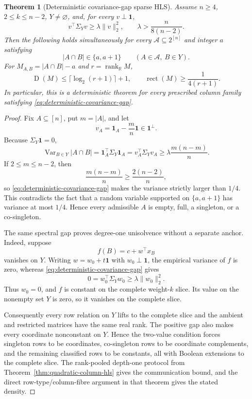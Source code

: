 \documentclass[11pt]{article}
\newtheorem{theorem}{Theorem}[section]
\theoremstyle{definition}
\theoremstyle{remark}
\newcommand{\cA}{\mathcal A}
\newcommand{\R}{\mathbb R}
\newcommand{\1}{\mathbf 1}
\newcommand{\Var}{\operatorname{Var}}
\newcommand{\rank}{\operatorname{rank}}
\newcommand{\rect}{\operatorname{rect}}
\newcommand{\Dcc}{\operatorname{D}}
\begin{document}
\begin{theorem}[Deterministic covariance-gap sparse HLS]
\label{thm:deterministic-spectral-sparse-hls}
Assume \(n\ge4\), \(2\le k\le n-2\), \(Y\ne\varnothing\), and, for every
\(v\perp\mathbf1\),
\begin{equation}\label{eq:deterministic-covariance-gap}
 v^\top\Sigma_Yv\ge\lambda\|v\|_2^2,
 \qquad
 \lambda>\frac{n}{8(n-2)}.
\end{equation}
Then the following holds simultaneously for every
\(\cA\subseteq2^{[n]}\) and integer \(a\) satisfying
\[
 |A\cap B|\in\{a,a+1\}
 \qquad(A\in\cA,\ B\in Y).
\]
For \(M_{A,B}=|A\cap B|-a\) and \(r=\rank_{\R}M\),
\[
 \Dcc(M)\le\lceil\log_2(r+1)\rceil+1,
 \qquad
 \rect(M)\ge\frac1{4(r+1)}.
\]
In particular, this is a deterministic theorem for every prescribed column
family satisfying \eqref{eq:deterministic-covariance-gap}.
\end{theorem}

\begin{proof}
Fix \(A\subseteq[n]\), put \(m=|A|\), and let
\[
 v_A=\mathbf1_A-\frac mn\mathbf1\in\mathbf1^\perp.
\]
Because \(\Sigma_Y\mathbf1=0\),
\[
 \Var_{B\in Y}|A\cap B|
 =\mathbf1_A^\top\Sigma_Y\mathbf1_A
 =v_A^\top\Sigma_Yv_A
 \ge\lambda\frac{m(n-m)}n.
\]
If \(2\le m\le n-2\), then
\[
 \frac{m(n-m)}n\ge\frac{2(n-2)}n,
\]
so \eqref{eq:deterministic-covariance-gap} makes the variance strictly larger
than \(1/4\).  This contradicts the fact that a random variable supported on
\(\{a,a+1\}\) has variance at most \(1/4\).  Hence every admissible \(A\) is
empty, full, a singleton, or a co-singleton.

The same spectral gap proves degree-one unisolvence without a separate
anchor.  Indeed, suppose
\[
 f(B)=c+w^\top x_B
\]
vanishes on \(Y\).  Writing
\(w=w_0+t\mathbf1\) with \(w_0\perp\mathbf1\), the empirical variance of
\(f\) is zero, whereas \eqref{eq:deterministic-covariance-gap} gives
\[
 0=w_0^\top\Sigma_Yw_0\ge\lambda\|w_0\|_2^2.
\]
Thus \(w_0=0\), and \(f\) is constant on the complete weight-\(k\) slice.
Its value on the nonempty set \(Y\) is zero, so it vanishes on the complete
slice.

Consequently every row relation on \(Y\) lifts to the complete slice and the
ambient and restricted matrices have the same real rank.  The positive gap
also makes every coordinate nonconstant on \(Y\).  Hence the two-value
condition forces singleton rows to be coordinates, co-singleton rows to be
coordinate complements, and the remaining classified rows to be constants,
all with Boolean extensions to the complete slice.  The rank-pooled
depth-one protocol from Theorem~\ref{thm:quadratic-column-hls} gives the
communication bound, and the direct row-type/column-fibre argument in that
theorem gives the stated density.
\end{proof}
\end{document}
